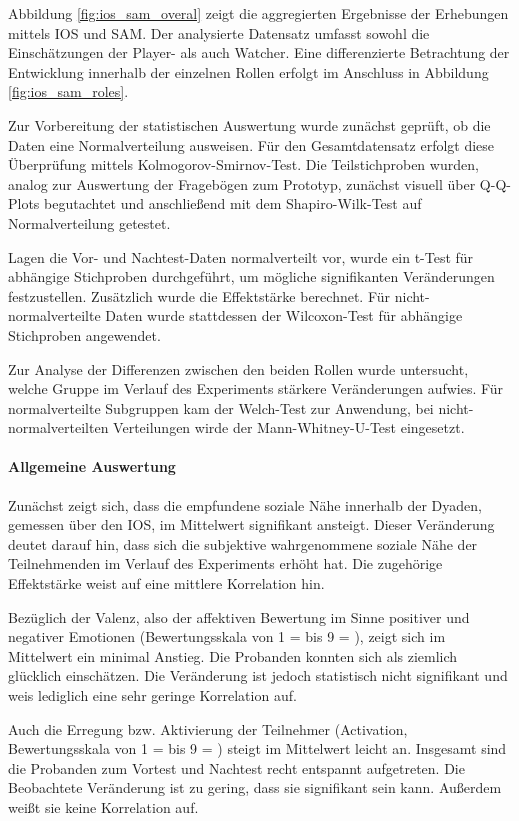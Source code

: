 Abbildung \ref{fig:ios_sam_overal} zeigt die aggregierten Ergebnisse der Erhebungen mittels \ac{IOS} und \ac{SAM}. Der analysierte Datensatz umfasst sowohl die Einschätzungen der Player- als auch Watcher. Eine differenzierte Betrachtung der Entwicklung innerhalb der einzelnen Rollen erfolgt im Anschluss in Abbildung \ref{fig:ios_sam_roles}.

Zur Vorbereitung der statistischen Auswertung wurde zunächst geprüft, ob die Daten eine Normalverteilung ausweisen. Für den Gesamtdatensatz erfolgt diese Überprüfung mittels Kolmogorov-Smirnov-Test. Die Teilstichproben wurden, analog zur Auswertung der Fragebögen zum Prototyp, zunächst visuell über \ac{Q-Q}-Plots begutachtet und anschließend mit dem Shapiro-Wilk-Test auf Normalverteilung getestet.

Lagen die Vor- und Nachtest-Daten normalverteilt vor, wurde ein t-Test für abhängige Stichproben durchgeführt, um mögliche signifikanten Veränderungen festzustellen. Zusätzlich wurde die Effektstärke berechnet. Für nicht-normalverteilte Daten wurde stattdessen der Wilcoxon-Test für abhängige Stichproben angewendet.

Zur Analyse der Differenzen zwischen den beiden Rollen wurde untersucht, welche Gruppe im Verlauf des Experiments stärkere Veränderungen aufwies. Für normalverteilte Subgruppen kam der Welch-Test zur Anwendung, bei nicht-normalverteilten Verteilungen wirde der Mann-Whitney-U-Test eingesetzt.

\paragraph{Allgemeine Auswertung}

Zunächst zeigt sich, dass die empfundene soziale Nähe innerhalb der Dyaden, gemessen über den \ac{IOS}, im Mittelwert signifikant ansteigt. Dieser Veränderung deutet darauf hin, dass sich die subjektive wahrgenommene soziale Nähe der Teilnehmenden im Verlauf des Experiments erhöht hat. Die zugehörige Effektstärke weist auf eine mittlere Korrelation hin.

Bezüglich der Valenz, also der affektiven Bewertung im Sinne positiver und negativer Emotionen (Bewertungsskala von 1 =  bis 9 = ), zeigt sich im Mittelwert ein minimal Anstieg. Die Probanden konnten sich als ziemlich glücklich einschätzen. Die Veränderung ist jedoch statistisch nicht signifikant und weis lediglich eine sehr geringe Korrelation auf.

Auch die Erregung bzw. Aktivierung der Teilnehmer (Activation, Bewertungsskala von 1 =  bis 9 = ) steigt im Mittelwert leicht an. Insgesamt sind die Probanden zum Vortest und Nachtest recht entspannt aufgetreten. Die Beobachtete Veränderung ist zu gering, dass sie signifikant sein kann. Außerdem weißt sie keine Korrelation auf.

